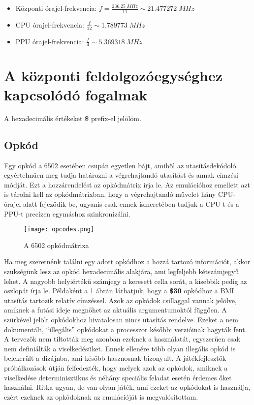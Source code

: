 \begin{itemize}
	\item Központi órajel-frekvencia: $ f = \frac{236.25\;MHz}{11} \sim 21.477272\; MHz $
	\item CPU órajel-frekvencia: $ \frac{f}{12} \sim 1.789773 \; MHz  $
	\item PPU órajel-frekvencia: $ \frac{f}{4}  \sim 5.369318 \; MHz $
\end{itemize}

\section{A központi feldolgozóegységhez kapcsolódó fogalmak}

\begin{note}
	A hexadecimális értékeket \textbf{\$} prefix-el jelölöm.
\end{note}

\subsection{Opkód} 
Egy opkód a 6502 esetében csupán egyetlen bájt, amiből az utasításdekódoló egyértelműen meg tudja határozni a végrehajtandó utasítást és annak címzési módját.
Ezt a hozzárendelést az opkódmátrix írja le. Az emulációhoz emellett azt is tárolni kell az opkódmátrixban, hogy a végrehajtandó művelet hány CPU-órajel alatt fejeződik be, ugyanis csak ennek ismeretében tudjuk a CPU-t és a PPU-t precízen egymáshoz szinkronizálni.

\begin{figure}[H]
	\centering
	\texttt{[image: opcodes.png]}
	\caption{A 6502 opkódmátrixa}
	\label{fig:opcodes}
\end{figure}

Ha meg szeretnénk találni egy adott opkódhoz a hozzá tartozó információt, akkor szükségünk lesz az opkód hexadecimális alakjára, ami legfeljebb kétszámjegyű lehet. A nagyobb helyiértékű számjegy a keresett cella sorát, a kisebbik pedig az oszlopát írja le. Példaként a \ref{fig:opcodes} ábrán láthatjuk, hogy a \textbf{\$30} opkódhoz a BMI utasítás tartozik relatív címzéssel.
Azok az opkódok csillaggal vannak jelölve, amiknek a futási ideje megnőhet az aktuális argumentumoktól függően.
A szürkével jelölt opkódokhoz hivatalosan nincs utasítás rendelve. 
Ezeket a nem dokumentált, ``illegális'' opkódokat a processzor későbbi 
verzióinak hagyták fent. A tervezők nem tiltották meg azonban ezeknek a használatát, 
egyszerűen csak nem definiálták a viselkedésüket. Ennek ellenére több olyan illegális opkód is belekerült a dizájnba, ami később hasznosnak bizonyult. A játékfejlesztők próbálkozások útján
felfedezték, hogy melyek azok az opkódok, amiknek a viselkedése determinisztikus és néhány speciális feladat esetén érdemes őket használni.
Ritka ugyan, de van olyan játék, ami ezeket az opkódokat is használja, ezért ezeknek az opkódoknak az emulációját is megvalósítottam.

